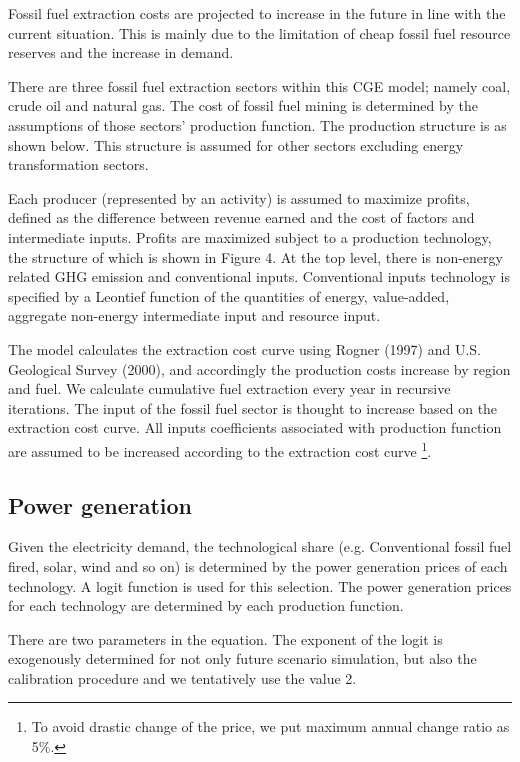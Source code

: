 \documentclass[10pt,a4paper,titlepage,dvipdfmx]{book}
\begin{document}
Fossil fuel extraction costs are projected to increase in the future in line with the current situation. This is mainly due to the limitation of cheap fossil fuel resource reserves and the increase in demand.

There are three fossil fuel extraction sectors within this CGE model; namely coal, crude oil and natural gas. The cost of fossil fuel mining is determined by the assumptions of those sectors' production function. The production structure is as shown below. This structure is assumed for other sectors excluding energy transformation sectors.

Each producer (represented by an activity) is assumed to maximize profits, defined as the difference between revenue earned and the cost of factors and intermediate inputs. Profits are maximized subject to a production technology, the structure of which is shown in Figure 4. At the top level, there is non-energy related GHG emission and conventional inputs. Conventional inputs technology is specified by a Leontief function of the quantities of energy, value-added, aggregate non-energy intermediate input and resource input.

The model calculates the extraction cost curve using Rogner (1997) and U.S. Geological Survey (2000), and accordingly the production costs increase by region and fuel. We calculate cumulative fuel extraction every year in recursive iterations. The input of the fossil fuel sector is thought to increase based on the extraction cost curve. All inputs coefficients associated with production function are assumed to be increased according to the extraction cost curve \footnote{To avoid drastic change of the price, we put maximum annual change ratio as 5\%.}. 

\subsection{\label{subsec:FosFueExt-PowGen}Power generation}

Given the electricity demand, the technological share (e.g. Conventional fossil fuel fired, solar, wind and so on) is determined by the power generation prices of each technology. A logit function is used for this selection. The power generation prices for each technology are determined by each production function.

There are two parameters in the equation. The exponent of the logit is exogenously determined for not only future scenario simulation, but also the calibration procedure and we tentatively use the value 2.
\end{document}
